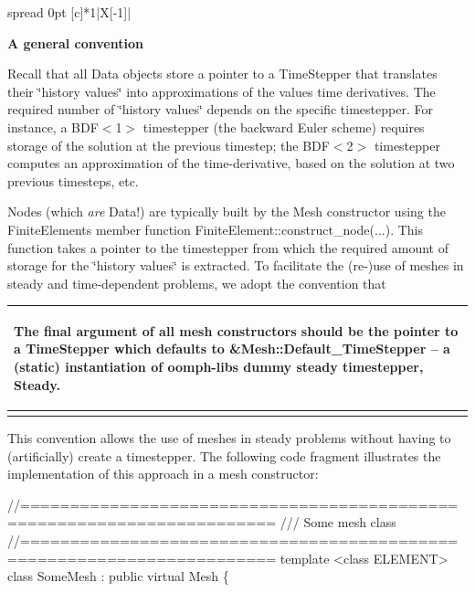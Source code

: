 \tabulinesep=1mm
\begin{longtabu} spread 0pt [c]{*{1}{|X[-1]}|}
\hline
\label{index_conv_mesh_const}%
%
\begin{center}{\bfseries A general convention}\end{center} 

Recall that all {\ttfamily Data} objects store a pointer to a {\ttfamily Time\+Stepper} that translates their \char`\"{}history values\char`\"{} into approximations of the values\textquotesingle{} time derivatives. The required number of \char`\"{}history values\char`\"{} depends on the specific timestepper. For instance, a B\+D\+F$<$1$>$ timestepper (the backward Euler scheme) requires storage of the solution at the previous timestep; the B\+D\+F$<$2$>$ timestepper computes an approximation of the time-\/derivative, based on the solution at two previous timesteps, etc.

{\ttfamily Nodes} (which {\itshape are} {\ttfamily Data!}) are typically built by the {\ttfamily Mesh} constructor using the {\ttfamily Finite\+Element\textquotesingle{}s} member function {\ttfamily Finite\+Element\+::construct\+\_\+node}(...). This function takes a pointer to the timestepper from which the required amount of storage for the \char`\"{}history values\char`\"{} is extracted. To facilitate the (re-\/)use of meshes in steady and time-\/dependent problems, we adopt the convention that

\begin{center} \begin{tabularx}{\linewidth}{|*{1}{>{\raggedright\arraybackslash}X|}}\hline
\begin{center} The final argument of all mesh constructors should be the pointer to a {\ttfamily Time\+Stepper} which defaults to {\ttfamily \&Mesh\+::\+Default\+\_\+\+Time\+Stepper} -- a (static) instantiation of {\ttfamily oomph-\/lib\textquotesingle{}s} dummy steady timestepper, {\ttfamily Steady}. \end{center}    \\\cline{1-1}
\end{tabularx}
\end{center} 

This convention allows the use of meshes in steady problems without having to (artificially) create a timestepper. The following code fragment illustrates the implementation of this approach in a mesh constructor\+:


\begin{DoxyCode}
\textcolor{comment}{//=======================================================================}\textcolor{comment}{}
\textcolor{comment}{/// Some mesh class}
\textcolor{comment}{}\textcolor{comment}{//=======================================================================}
\textcolor{keyword}{template} <\textcolor{keyword}{class} ELEMENT>
\textcolor{keyword}{class }SomeMesh : \textcolor{keyword}{public} \textcolor{keyword}{virtual} Mesh
\{


\end{DoxyCode}
\end{longtabu}
